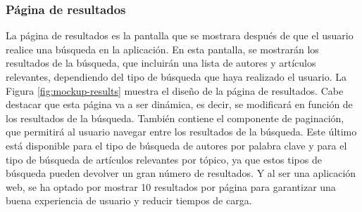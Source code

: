 \subsubsection{Página de resultados}
La página de resultados es la pantalla que se mostrara después de que el usuario realice una búsqueda en la aplicación.
En esta pantalla, se mostrarán los resultados de la búsqueda, que incluirán una lista de autores y artículos relevantes, dependiendo del tipo de búsqueda que haya realizado el usuario.
La Figura \ref{fig:mockup-results} muestra el diseño de la página de resultados. Cabe destacar que esta página va a ser dinámica, es decir, se modificará en función de los resultados de la búsqueda.
También contiene el componente de paginación, que permitirá al usuario navegar entre los resultados de la búsqueda. Este último está disponible para el tipo de búsqueda de autores por palabra clave y para el tipo de búsqueda de artículos relevantes por tópico, ya que estos tipos de búsqueda pueden devolver un gran número de resultados. Y al ser una aplicación web, se ha optado por mostrar 10 resultados por página para garantizar una buena experiencia de usuario y reducir tiempos de carga.

